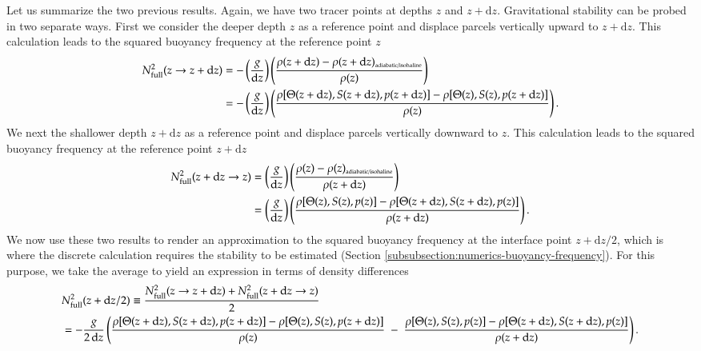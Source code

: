 Let us summarize the two previous results.  Again, we have two tracer
points at depths $z$ and $z+\mathrm{d}z$.  Gravitational stability can
be probed in two separate ways. First we consider the deeper depth $z$
as a reference point and displace parcels vertically upward to
$z+\mathrm{d}z$.  This calculation leads to the squared buoyancy
frequency at the reference point $z$
\begin{equation}
\begin{split}
 N^{2}_{\mbox{\scriptsize full}}(z \rightarrow z + \mathrm{d}z)
 &=
 -\left( \frac{g}{\mathrm{d}z} \right)
  \left(  \frac{\rho(z+\mathrm{d} z)  - \rho(z+\mathrm{d} z)_{\mbox{\tiny adiabatic/isohaline}} }{\rho(z) } \right)
\\
&=
 -\left( \frac{g}{\mathrm{d}z } \right)  \left( 
 \frac{\rho[ \Theta(z + \mathrm{d} z), S(z + \mathrm{d} z), p(z + \mathrm{d} z)]
-
\rho[ \Theta(z), S(z), p(z + \mathrm{d}z)] }{\rho(z)}
\right).
\end{split}
\label{eq:infinitesimal-delta-rho-elements-upwards-summary}
\end{equation}
We next the shallower depth $z+\mathrm{d}z$ as a reference point and
displace parcels vertically downward to $z$.  This calculation leads
to the squared buoyancy frequency at the reference point
$z+\mathrm{d}z$
\begin{equation}
\begin{split}
 N^{2}_{\mbox{\scriptsize full}}(z + \mathrm{d}z \rightarrow z)
 &=
 \left( \frac{g}{\mathrm{d}z} \right)
 \left(  \frac{ \rho(z)  - \rho(z)_{\mbox{\tiny adiabatic/isohaline}}  }{\rho(z+\mathrm{d}z)  } \right)  
 \\
 &=
 \left( \frac{g}{\mathrm{d}z } \right) 
 \left( \frac{ \rho[ \Theta(z), S(z), p(z)]- \rho[ \Theta(z+\mathrm{d}z), S(z+\mathrm{d}z), p(z)]
  }{\rho(z+\mathrm{d}z)}  
\right).
\end{split}
\label{eq:infinitesimal-delta-rho-elements-downward-summary}
\end{equation}
We now use these two results to render an approximation to the squared
buoyancy frequency at the interface point $z + \mathrm{d}z/2$, which
is where the discrete calculation requires the stability to be
estimated (Section \ref{subsubsection:numerics-buoyancy-frequency}).
For this purpose, we take the average to yield an expression in terms
of density differences \small
\begin{equation}
\begin{split}
&N^{2}_{\mbox{\scriptsize full}}(z+\mathrm{d}z/2) 
 \equiv 
 \frac{N^{2}_{\mbox{\scriptsize full}}(z \rightarrow z + \mathrm{d}z) + N^{2}_{\mbox{\scriptsize full}}(z + \mathrm{d}z \rightarrow z)}{2}
\\
&= -\frac{g}{2 \, \mathrm{d}z} 
  \left( 
 \frac{
    \rho[ \Theta(z + \mathrm{d} z), S(z + \mathrm{d} z), p(z + \mathrm{d} z)]
  -\rho[ \Theta(z), S(z), p(z + \mathrm{d}z)]
  }{\rho(z) }
 \; - \; 
 \frac{ \rho[ \Theta(z), S(z), p(z)]-
 \rho[ \Theta(z+\mathrm{d}z), S(z+\mathrm{d}z), p(z)]
  }{\rho(z+\mathrm{d}z) }
 \right).
\end{split}
\label{eq:n2-in-terms-of-density-differences}
\end{equation}
